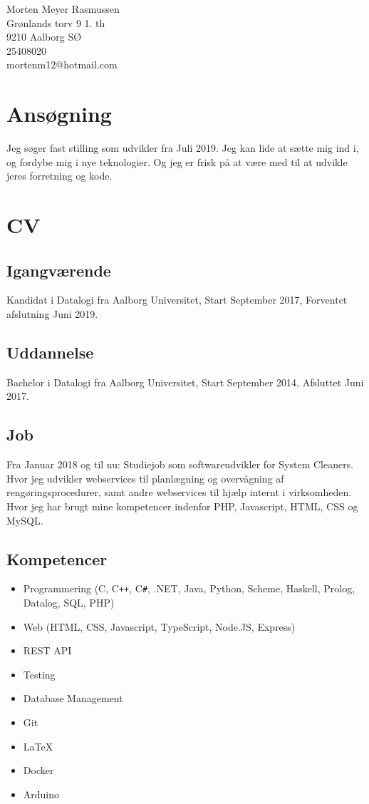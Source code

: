 \documentclass{article}
\begin{document}
\begin{minipage}[b]{1\linewidth}
\begin{flushright}
Morten Meyer Rasmussen\\
Grønlands torv 9 1. th\\9210 Aalborg SØ\\
25408020\\
mortenm12@hotmail.com
\end{flushright}
\end{minipage}

\section*{Ans\o{}gning}

Jeg søger fast stilling som udvikler fra Juli 2019.
Jeg kan lide at sætte mig ind i, og fordybe mig i nye teknologier.
Og jeg er frisk på at være med til at udvikle jeres forretning og kode.


\section*{CV}

\subsection*{Igangværende}
Kandidat i Datalogi fra Aalborg Universitet, Start September 2017, Forventet afslutning Juni 2019.

\subsection*{Uddannelse}
Bachelor i Datalogi fra Aalborg Universitet, Start September 2014, Afsluttet Juni 2017.

\subsection*{Job}
Fra Januar 2018 og til nu: Studiejob som softwareudvikler for System Cleaners. Hvor jeg udvikler webservices til planlægning og overvågning af rengøringsprocedurer, samt andre webservices til hjælp internt i virksomheden. Hvor jeg har brugt mine kompetencer indenfor PHP, Javascript, HTML, CSS og MySQL.

\subsection*{Kompetencer}
\begin{itemize}
\item Programmering (C, C\texttt{++}, C\texttt{\#}, .NET, Java, Python, Scheme, Haskell, Prolog, Datalog, SQL, PHP)
\item Web (HTML, CSS, Javascript, TypeScript, Node.JS, Express)
\item REST API
\item Testing
\item Database Management
\item Git
\item \LaTeX
\item Docker
\item Arduino
\end{itemize}
\end{document}
